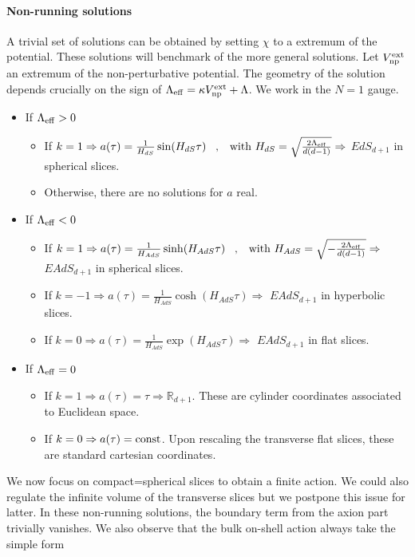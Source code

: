 \documentclass[a4paper]{article}
\def\sp{\;\;\;,\;\;\;}
\begin{document}
\paragraph{Non-running solutions}
A trivial set of solutions can be obtained by setting $\chi$ to a extremum of the potential. These solutions will benchmark of the more general solutions. Let $V_{\rm np}^{\rm ext}$ an extremum of the non-perturbative potential. The geometry of the solution depends crucially on the sign of $\Lambda_{\rm eff}=\kappa V_{\rm np}^{\rm ext}+\Lambda$. We work in the $N=1$ gauge. 
\begin{itemize}
  \item If $\Lambda_{\rm eff}>0$
  \begin{itemize}
    \item If $k=1\Rightarrow a(\tau)=\frac{1}{H_{dS}}\sin(H_{dS}\tau)\sp \text{with } H_{dS}=\sqrt{\frac{2\Lambda_{\rm eff}}{d(d-1)}}\Rightarrow$ $EdS_{d+1}$ in spherical slices.
    \item Otherwise, there are no solutions for $a$ real.
  \end{itemize}
  \item If $\Lambda_{\rm eff}<0$
  \begin{itemize}
    \item If $k=1\Rightarrow a(\tau)=\frac{1}{H_{AdS}}\sinh(H_{AdS}\tau)\sp \text{with } H_{AdS}=\sqrt{-\frac{2\Lambda_{\rm eff}}{d(d-1)}}\Rightarrow$ $EAdS_{d+1}$ in spherical slices.
    \item If $k=-1\Rightarrow a(\tau)=\frac{1}{H_{AdS}}\cosh(H_{AdS}\tau)\Rightarrow$ $EAdS_{d+1}$ in hyperbolic slices.
    \item If $k=0\Rightarrow a(\tau)=\frac{1}{H_{AdS}}\exp(H_{AdS}\tau)\Rightarrow$ $EAdS_{d+1}$ in flat slices.
  \end{itemize}
  \item If $\Lambda_{\rm eff}=0$
    \begin{itemize}
      \item If $k=1\Rightarrow a(\tau)=\tau \Rightarrow \mathbb{R}_{d+1}$. These are cylinder coordinates associated to Euclidean space.
      \item If $k=0\Rightarrow a(\tau) = \rm{const}$. Upon rescaling the transverse flat slices, these are standard cartesian coordinates.
    \end{itemize}
\end{itemize}
We now focus on compact=spherical slices to obtain a finite action. We could also regulate the infinite volume of the transverse slices but we postpone this issue for latter. In these non-running solutions, the boundary term from the axion part trivially vanishes. We also observe that the bulk on-shell action always take the simple form
\end{document}
